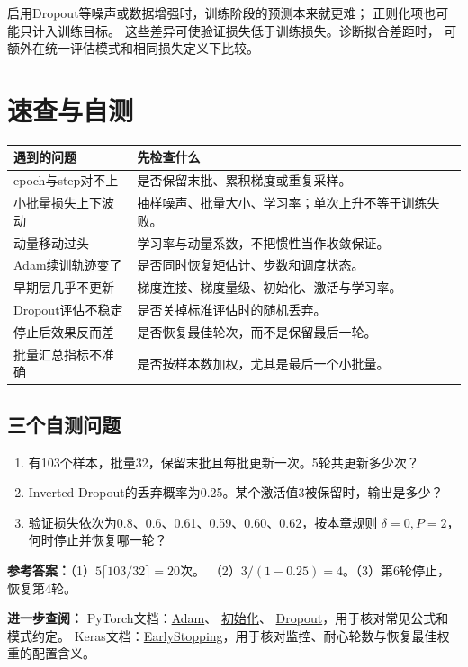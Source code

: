 \begin{pitfall}[训练曲线与验证曲线要有可比口径]
启用Dropout等噪声或数据增强时，训练阶段的预测本来就更难；
正则化项也可能只计入训练目标。
这些差异可使验证损失低于训练损失。诊断拟合差距时，
可额外在统一评估模式和相同损失定义下比较。
\end{pitfall}

\section{速查与自测}
\label{sec:train-summary}

\begingroup
\small
\renewcommand{\arraystretch}{1.2}
\begin{xltabular}{\textwidth}{P{40mm}Y}
\toprule
遇到的问题 & 先检查什么\\
\midrule
\endhead
\bottomrule
\endfoot
epoch与step对不上 & 是否保留末批、累积梯度或重复采样。\\
小批量损失上下波动 & 抽样噪声、批量大小、学习率；单次上升不等于训练失败。\\
动量移动过头 & 学习率与动量系数，不把惯性当作收敛保证。\\
Adam续训轨迹变了 & 是否同时恢复矩估计、步数和调度状态。\\
早期层几乎不更新 & 梯度连接、梯度量级、初始化、激活与学习率。\\
Dropout评估不稳定 & 是否关掉标准评估时的随机丢弃。\\
停止后效果反而差 & 是否恢复最佳轮次，而不是保留最后一轮。\\
批量汇总指标不准确 & 是否按样本数加权，尤其是最后一个小批量。\\

\end{xltabular}
\endgroup

\subsection{三个自测问题}
\begin{enumerate}
\setlength{\itemsep}{1pt}\setlength{\parsep}{0pt}
 \item 有103个样本，批量32，保留末批且每批更新一次。5轮共更新多少次？
 \item Inverted Dropout的丢弃概率为0.25。某个激活值3被保留时，输出是多少？
 \item 验证损失依次为0.8、0.6、0.61、0.59、0.60、0.62，按本章规则 $\delta=0,P=2$，何时停止并恢复哪一轮？
\end{enumerate}
\textbf{参考答案：}（1）$5\lceil103/32\rceil=20$次。
（2）$3/(1-0.25)=4$。（3）第6轮停止，恢复第4轮。

\par\begingroup\small
\noindent\textbf{进一步查阅：}
PyTorch文档：\href{https://docs.pytorch.org/docs/stable/generated/torch.optim.Adam.html}{Adam}、
 \href{https://docs.pytorch.org/docs/stable/nn.init.html}{初始化}、
 \href{https://docs.pytorch.org/docs/stable/generated/torch.nn.Dropout.html}{Dropout}，用于核对常见公式和模式约定。
Keras文档：\href{https://keras.io/api/callbacks/early_stopping/}{EarlyStopping}，用于核对监控、耐心轮数与恢复最佳权重的配置含义。
\par\endgroup

